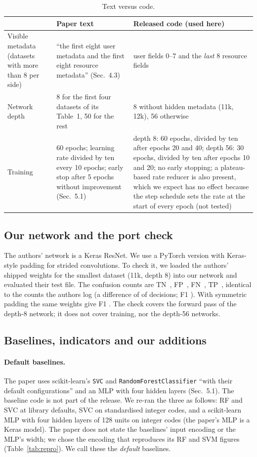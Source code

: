 \documentclass[11pt,a4paper]{article}
\begin{document}
\begin{table}[h]
\centering\footnotesize
\begin{tabular}{@{}>{\raggedright\arraybackslash}p{3.3cm}p{4.2cm}p{5.8cm}@{}}
\toprule
 & Paper text & Released code (used here) \\
\midrule
Visible metadata (datasets with more than 8 per side) & ``the first eight user metadata and the first eight resource metadata'' (Sec.~4.3) & user fields 0--7 and the \emph{last} 8 resource fields \\
Network depth & 8 for the first four datasets of its Table~1, 50 for the rest & 8 without hidden metadata (11k, 12k), 56 otherwise \\
Training & 60 epochs; learning rate divided by ten every 10 epochs; early stop after 5 epochs without improvement (Sec.~5.1) & depth 8: 60 epochs, divided by ten after epochs 20 and 40; depth 56: 30 epochs, divided by ten after epochs 10 and 20; no early stopping; a plateau-based rate reducer is also present, which we expect has no effect because the step schedule sets the rate at the start of every epoch (not tested) \\
\bottomrule
\end{tabular}
\caption{Text versus code.}\label{tab:textcode}
\end{table}

\subsection{Our network and the port check}
The authors' network is a Keras ResNet. We use a PyTorch version with Keras-style padding for strided convolutions. To check it, we loaded the authors' shipped weights for the smallest dataset (11k, depth 8) into our network and evaluated their test file. The confusion counts are TN~\portTN, FP~\portFP, FN~\portFN, TP~\portTP, identical to the counts the authors log (a difference of \portDiff{} of \portDecisions{} decisions; F1 \portFOne). With symmetric padding the same weights give F1 \portFOneSymmetric. The check covers the forward pass of the depth-8 network; it does not cover training, nor the depth-56 networks.

\subsection{Baselines, indicators and our additions}\label{sec:additions}
\paragraph{Default baselines.} The paper uses scikit-learn's \texttt{SVC} and \texttt{RandomForestClassifier} ``with their default configurations'' and an MLP with four hidden layers (Sec.~5.1). The baseline code is not part of the release. We re-ran the three as follows: RF and SVC at library defaults, SVC on standardised integer codes, and a scikit-learn MLP with four hidden layers of 128 units on integer codes (the paper's MLP is a Keras model). The paper does not state the baselines' input encoding or the MLP's width; we chose the encoding that reproduces its RF and SVM figures (Table~\ref{tab:repro}). We call these the \emph{default} baselines.
\end{document}
